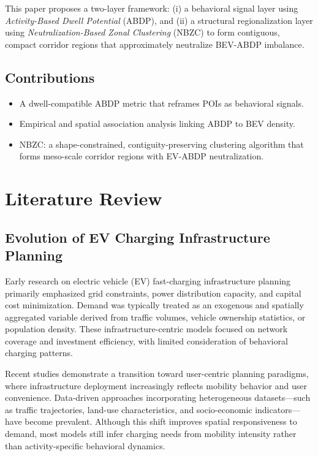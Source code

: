 \documentclass[conference]{IEEEtran}
\begin{document}
This paper proposes a two-layer framework:
(i) a behavioral signal layer using \emph{Activity-Based Dwell Potential} (ABDP),
and (ii) a structural regionalization layer using \emph{Neutralization-Based Zonal
Clustering} (NBZC) to form contiguous, compact corridor regions that
approximately neutralize BEV-ABDP imbalance.

\subsection{Contributions}
\begin{itemize}
  \item A dwell-compatible ABDP metric that reframes POIs as behavioral signals.
  \item Empirical and spatial association analysis linking ABDP to BEV density.
  \item NBZC: a shape-constrained, contiguity-preserving clustering algorithm
  that forms meso-scale corridor regions with EV-ABDP neutralization.
\end{itemize}

\section{Literature Review}

\subsection{Evolution of EV Charging Infrastructure Planning}

Early research on electric vehicle (EV) fast-charging infrastructure planning primarily emphasized grid constraints, power distribution capacity, and capital cost minimization. Demand was typically treated as an exogenous and spatially aggregated variable derived from traffic volumes, vehicle ownership statistics, or population density.\cite{BIAN2022} These infrastructure-centric models focused on network coverage and investment efficiency, with limited consideration of behavioral charging patterns.

Recent studies demonstrate a transition toward user-centric planning paradigms, where infrastructure deployment increasingly reflects mobility behavior and user convenience. Data-driven approaches incorporating heterogeneous datasets—such as traffic trajectories, land-use characteristics, and socio-economic indicators—have become prevalent. Although this shift improves spatial responsiveness to demand, most models still infer charging needs from mobility intensity rather than activity-specific behavioral dynamics.
\end{document}

